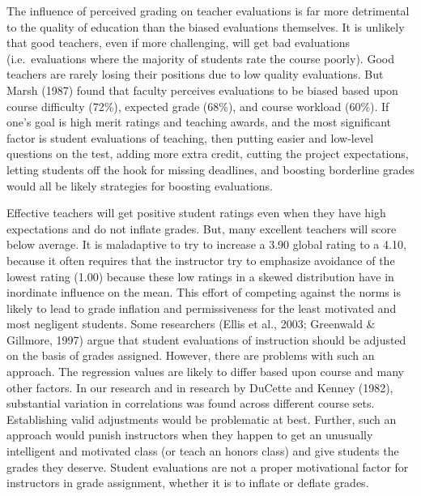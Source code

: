 \documentclass[man]{apa6}
\theoremstyle{definition}
\theoremstyle{definition}
\theoremstyle{definition}
\theoremstyle{remark}
\begin{document}
The influence of perceived grading on teacher evaluations is far more detrimental to the quality of education than the biased evaluations themselves. It is unlikely that good teachers, even if more challenging, will get bad evaluations (i.e.~evaluations where the majority of students rate the course poorly). Good teachers are rarely losing their positions due to low quality evaluations. But Marsh (1987) found that faculty perceives evaluations to be biased based upon course difficulty (72\%), expected grade (68\%), and course workload (60\%). If one's goal is high merit ratings and teaching awards, and the most significant factor is student evaluations of teaching, then putting easier and low-level questions on the test, adding more extra credit, cutting the project expectations, letting students off the hook for missing deadlines, and boosting borderline grades would all be likely strategies for boosting evaluations.

Effective teachers will get positive student ratings even when they have high expectations and do not inflate grades. But, many excellent teachers will score below average. It is maladaptive to try to increase a 3.90 global rating to a 4.10, because it often requires that the instructor try to emphasize avoidance of the lowest rating (1.00) because these low ratings in a skewed distribution have in inordinate influence on the mean. This effort of competing against the norms is likely to lead to grade inflation and permissiveness for the least motivated and most negligent students. Some researchers (Ellis et al., 2003; Greenwald \& Gillmore, 1997) argue that student evaluations of instruction should be adjusted on the basis of grades assigned. However, there are problems with such an approach. The regression values are likely to differ based upon course and many other factors. In our research and in research by DuCette and Kenney (1982), substantial variation in correlations was found across different course sets. Establishing valid adjustments would be problematic at best. Further, such an approach would punish instructors when they happen to get an unusually intelligent and motivated class (or teach an honors class) and give students the grades they deserve. Student evaluations are not a proper motivational factor for instructors in grade assignment, whether it is to inflate or deflate grades.
\end{document}
